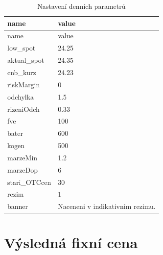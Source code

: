 \documentclass[
]{article}
\begin{document}
\begin{longtable}[]{@{}ll@{}}
\caption{Nastavení denních parametrů}\tabularnewline
\toprule\noalign{}
name & value \\
\midrule\noalign{}
\endfirsthead
\toprule\noalign{}
name & value \\
\midrule\noalign{}
\endhead
\bottomrule\noalign{}
\endlastfoot
low\_spot & 24.25 \\
aktual\_spot & 24.35 \\
cnb\_kurz & 24.23 \\
riskMargin & 0 \\
odchylka & 1.5 \\
rizeniOdch & 0.33 \\
fve & 100 \\
bater & 600 \\
kogen & 500 \\
marzeMin & 1.2 \\
marzeDop & 6 \\
stari\_OTCcen & 30 \\
rezim & 1 \\
banner & Naceneni v indikativnim rezimu. \\
\end{longtable}

\section{Výsledná fixní cena}\label{vuxfdslednuxe1-fixnuxed-cena}
\end{document}
